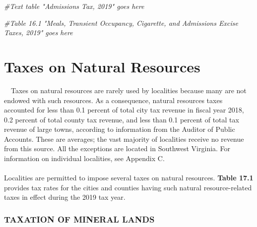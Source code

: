 \documentclass[
]{book}
\newenvironment{Shaded}{\begin{snugshade}}{\end{snugshade}}
\newcommand{\CommentTok}[1]{\textcolor[rgb]{0.56,0.35,0.01}{\textit{#1}}}
\begin{document}
\begin{Shaded}
\begin{Highlighting}[]
\CommentTok{\#Text table "Admissions Tax, 2019" goes here}

\CommentTok{\#Table 16.1 "Meals, Transient Occupancy, Cigarette, and Admissions Excise Taxes, 2019" goes here}
\end{Highlighting}
\end{Shaded}

\hypertarget{taxes-on-natural-resources}{%
\chapter{Taxes on Natural Resources}\label{taxes-on-natural-resources}}

~~Taxes on natural resources are rarely used by localities because many are not endowed with such resources. As a consequence, natural resources taxes accounted for less than 0.1 percent of total city tax revenue in fiscal year 2018, 0.2 percent of total county tax revenue, and less than 0.1 percent of total tax revenue of large towns, according to information from the Auditor of Public Accounts. These are averages; the vast majority of localities receive no revenue from this source. All the exceptions are located in Southwest Virginia. For information on individual localities, see Appendix C.\\
~\\
\hspace*{0.333em}\hspace*{0.333em}Localities are permitted to impose several taxes on natural resources. \textbf{Table 17.1} provides tax rates for the cities and counties having such natural resource-related taxes in effect during the 2019 tax year.\\

\hypertarget{taxation-of-mineral-lands}{%
\subsection{TAXATION OF MINERAL LANDS}\label{taxation-of-mineral-lands}}
\end{document}
